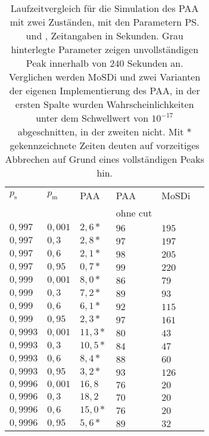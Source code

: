\begin{table}[h]
\centering
\caption[Laufzeitvergleich für die Simulation des PAA mit zwei Zuständen]{Laufzeitvergleich für die Simulation des PAA mit zwei Zuständen, mit den Parametern \ps und \pm, Zeitangaben in Sekunden. Grau hinterlegte Parameter zeigen unvollständigen Peak innerhalb von $240$ Sekunden an. Verglichen werden MoSDi und zwei Varianten der eigenen Implementierung des PAA, in der ersten Spalte wurden Wahrscheinlichkeiten unter dem Schwellwert von $10^{-17}$ abgeschnitten, in der zweiten nicht. Mit $*$ gekennzeichnete Zeiten deuten auf vorzeitiges Abbrechen auf Grund eines vollständigen Peaks hin.}
\label{2s_laufzeit_paa}
\begin{tabular}{|l|l||l|l|l|l|} \hline
$p_\text{s}$ & $p_\text{m}$  & PAA & PAA & MoSDi \\
& & & ohne cut & \\  \hline \hline
$0,997  $ & $ 0,001$ & $2,6*  $ & $96 $ & $ 195$ \\ \hline
$0,997  $ & $ 0,3  $ & $2,8*  $ & $97 $ & $ 197 $ \\ \hline
$0,997  $ & $ 0,6  $ & $2,1*  $ & $98 $ & $ 205 $ \\ \hline
$0,997  $ & $ 0,95 $ & $0,7*  $ & $99 $ & $ 220$ \\ \hline
$0,999  $ & $ 0,001$ & $8,0*  $ & $86 $ & $ 79$ \\ \hline
$0,999  $ & $ 0,3  $ & $7,2*  $ & $89 $ & $ 93$ \\ \hline
$0,999  $ & $ 0,6  $ & $6,1*  $ & $92 $ & $ 115$ \\ \hline
$0,999  $ & $ 0,95 $ & $2,3*  $ & $97 $ & $ 161$ \\ \hline
$0,9993 $ & $ 0,001$ & $11,3* $ & $80 $ & $ 43$ \\ \hline
$0,9993 $ & $ 0,3  $ & $10,5* $ & $84 $ & $ 47$ \\ \hline
$0,9993 $ & $ 0,6  $ & $8,4*  $ & $88 $ & $ 60$ \\ \hline
$0,9993 $ & $ 0,95 $ & $3,2*  $ & $93 $ & $ 126$ \\ \hline
\cellcolor{gray!25}$0,9996 $ &\cellcolor{gray!25} $ 0,001$ & $16,8 $ & $76 $ & $ 20$ \\ \hline
$0,9996 $ & $ 0,3  $ & $18,2 $ & $70 $ & $ 20$ \\ \hline
$0,9996 $ & $ 0,6  $ & $15,0* $ & $76 $ & $ 20$ \\ \hline
$0,9996 $ & $ 0,95 $ & $5,6*  $ & $89 $ & $ 32$ \\ \hline
\end{tabular}
\end{table}


